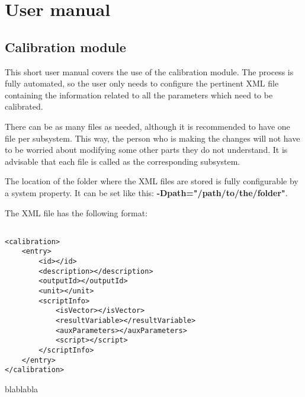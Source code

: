 \section{User manual}
\subsection{Calibration module}
This short user manual covers the use of the calibration module. The process is fully automated, so the user only needs to configure the pertinent XML file containing the information related to all the parameters which need to be calibrated.

There can be as many files as needed, although it is recommended to have one file per subsystem. This way, the person who is making the changes will not have to be worried about modifying some other parts they do not understand. It is advisable that each file is called as the corresponding subsystem.


The location of the folder where the XML files are stored is fully configurable by a system property. It can be set like this: \textbf{-Dpath="/path/to/the/folder"}.

The XML file has the following format:
\begin{table}[h]
\lstset{language=XML}
\begin{lstlisting}

<calibration>
	<entry>
		<id></id>
		<description></description>
		<outputId></outputId>
		<unit></unit>
		<scriptInfo>
			<isVector></isVector>
			<resultVariable></resultVariable>
			<auxParameters></auxParameters>
			<script></script>
		</scriptInfo>
	</entry>
</calibration>
\end{lstlisting}
\caption{blablabla}
\label{Table5.1}
\end{table}

